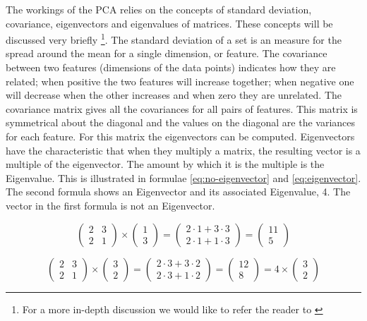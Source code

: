 The workings of the PCA \cite{smith2002tutorial} relies on the concepts of 
standard deviation, 
covariance, eigenvectors and eigenvalues of matrices. These concepts will be 
discussed very briefly \footnote{For a more in-depth discussion we would like 
to refer the reader to \cite{jolliffe2005principal}}. The standard deviation 
of a set is an measure for the 
spread around the mean for a single dimension, or feature. The covariance 
between two features (dimensions of the data points) indicates how they are 
related; when positive the two 
features will increase together; when negative one will decrease when the 
other increases and when zero they are unrelated. The covariance matrix gives 
all the covariances for all pairs of features. This matrix is symmetrical 
about the diagonal and the values on the diagonal are the variances for each 
feature. For this matrix the eigenvectors can be computed. Eigenvectors have 
the characteristic that when they multiply a matrix, the resulting vector is a 
multiple of the eigenvector. The amount by which it is the multiple is the 
Eigenvalue. This is illustrated in formulae \ref{eq:no-eigenvector} and 
\ref{eq:eigenvector}. The second formula shows an Eigenvector and its 
associated Eigenvalue, 4. The vector in the first formula is not an 
Eigenvector. 

\begin{equation} \label{eq:no-eigenvector}
	\begin{pmatrix} 2 & 3 \\ 2 & 1 \end{pmatrix}
\times
	\begin{pmatrix} 1 \\ 3 \end{pmatrix}
=
	\begin{pmatrix} 2 \cdot 1 + 3 \cdot 3 \\ 2 \cdot 1 + 1 \cdot 3 
	\end{pmatrix}
=
	\begin{pmatrix} 11 \\ 5 \end{pmatrix}
\end{equation}

\begin{equation} \label{eq:eigenvector}
	\begin{pmatrix} 2 & 3 \\ 2 & 1 \end{pmatrix}
\times
	\begin{pmatrix} 3 \\ 2 \end{pmatrix}
=
	\begin{pmatrix} 2 \cdot 3 + 3 \cdot 2 \\ 2 \cdot 3 + 1 \cdot 2  
	\end{pmatrix}
=
	\begin{pmatrix} 12 \\ 8 \end{pmatrix}
=
	4 \times \begin{pmatrix} 3 \\ 2 \end{pmatrix}
\end{equation}

